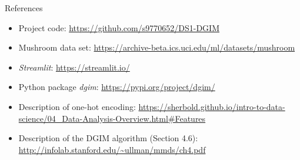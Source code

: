 \begin{frame}{References}
	\begin{itemize}
		\item
		Project code:
		\url{https://github.com/s9770652/DS1-DGIM}
		
		\item
		Mushroom data set:
		\url{https://archive-beta.ics.uci.edu/ml/datasets/mushroom}
		
		\item
		\emph{Streamlit}:
		\url{https://streamlit.io/}
		
		\item
		Python package \emph{dgim}:
		\url{https://pypi.org/project/dgim/}
		
		\item
		Description of one-hot encoding:
		\url{https://sherbold.github.io/intro-to-data-science/04_Data-Analysis-Overview.html\#Features}
		
		\item
		Description of the DGIM algorithm (Section 4.6):
		\url{http://infolab.stanford.edu/~ullman/mmds/ch4.pdf}
	\end{itemize}
\end{frame}